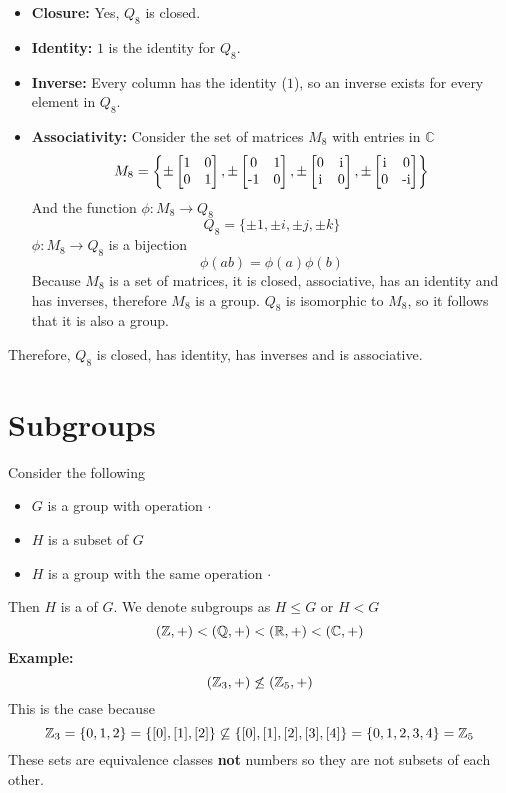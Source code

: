 \documentclass[openany]{report}
\begin{document}
\begin{itemize}
    \item \textbf{Closure:} Yes, $Q_8$ is closed.
    \item \textbf{Identity:} $1$ is the identity for $Q_8$.
    \item \textbf{Inverse:} Every column has the identity ($1$), so an inverse exists for every element in $Q_8$.
    \item \textbf{Associativity:} Consider the set of matrices $M_8$ with entries in $\mathbb{C}$
    \begin{align*}
        M_8 = \left\{ 
        \pm \begin{bmatrix}
         $1$ & $0$ \\
         $0$ & $1$
        \end{bmatrix},
        \pm \begin{bmatrix}
            $0$ & $1$ \\
            $-1$ & $0$
        \end{bmatrix},
        \pm \begin{bmatrix}
            $0$ & $i$ \\
            $i$ & $0$
        \end{bmatrix},
        \pm \begin{bmatrix}
            $i$ & $0$\\
            $0$ & $-i$
        \end{bmatrix}
        \right\}
    \end{align*}
    And the function $\phi: M_8 \rightarrow Q_8$ 
    $$Q_8 = \{\pm 1, \pm i, \pm j, \pm k\}$$
    $\phi: M_8 \rightarrow Q_8$ is a bijection
    $$\phi(ab) = \phi(a)\phi(b)$$
    Because $M_8$ is a set of matrices, it is closed, associative, has an identity and has inverses, therefore $M_8$ is a group. $Q_8$ is isomorphic to $M_8$, so it follows that it is also a group. 
\end{itemize}
Therefore, $Q_8$ is closed, has identity, has inverses and is associative. 
\section{Subgroups}
Consider the following 
\begin{itemize}
    \item $G$ is a group with operation $\cdot$
    \item $H$ is a subset of $G$
    \item $H$ is a group with the same operation $\cdot$
\end{itemize}
Then $H$ is a  of $G$. We denote subgroups as $H \leq G$ or $H < G$
$$(\mathbb{Z}, +) < (\mathbb{Q}, +) < (\mathbb{R}, +) < (\mathbb{C}, +)$$
\textbf{Example:}
$$(\mathbb{Z}_3, +) \not\leq (\mathbb{Z}_5, + )$$
This is the case because 
$$\mathbb{Z}_3 = \{0,1,2\} = \{[0], [1], [2]\} \not\subseteq \{[0], [1], [2], [3], [4]\} = \{0,1,2,3,4\} = \mathbb{Z}_5$$
These sets are equivalence classes \textbf{not} numbers so they are not subsets of each other.
\end{document}
